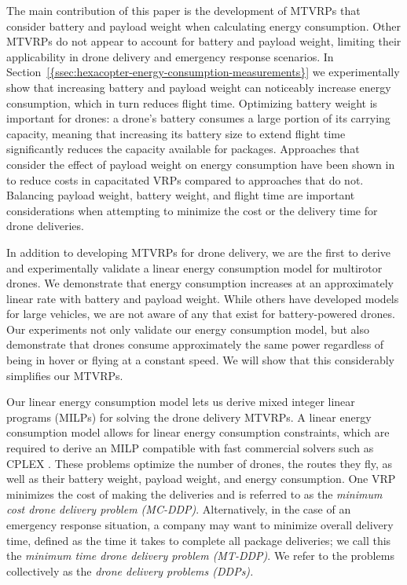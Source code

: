 \documentclass[journal]{IEEEtran}
\begin{document}
The main contribution of this paper is the development of MTVRPs that consider battery and payload weight when calculating energy consumption. Other MTVRPs do not appear to account for battery and payload weight, limiting their applicability in drone delivery and emergency response scenarios. In {Section~\ref{{ssec:hexacopter-energy-consumption-measurements}}} we experimentally show that increasing battery and payload weight can noticeably increase energy consumption, which in turn reduces flight time. Optimizing battery weight is important for drones: a drone's battery consumes a large portion of its carrying capacity, meaning that increasing its battery size to extend flight time significantly reduces the capacity available for packages. Approaches that consider the effect of payload weight on energy consumption have been shown in \cite{Xiao2012} to reduce costs in capacitated VRPs compared to approaches that do not. Balancing payload weight, battery weight, and flight time are important considerations when attempting to minimize the cost or the delivery time for drone deliveries.

In addition to developing MTVRPs for drone delivery, we are the first to derive and experimentally validate a linear energy consumption model for multirotor drones. We demonstrate that energy consumption increases at an approximately linear rate with battery and payload weight. While others have developed models for large vehicles, we are not aware of any that exist for battery-powered drones. Our experiments not only validate our energy consumption model, but also demonstrate that drones consume approximately the same power regardless of being in hover or flying at a constant speed. We will show that this considerably simplifies our MTVRPs.

Our linear energy consumption model lets us derive mixed integer linear programs (MILPs) for solving the drone delivery MTVRPs. A linear energy consumption model allows for linear energy consumption constraints, which are required to derive an MILP compatible with fast commercial solvers such as CPLEX \cite{cplex}. These problems optimize the number of drones, the routes they fly, as well as their battery weight, payload weight, and energy consumption. One VRP minimizes the cost of making the deliveries and is referred to as the \emph{minimum cost drone delivery problem (MC-DDP)}. Alternatively, in the case of an emergency response situation, a company may want to minimize overall delivery time, defined as the time it takes to complete all package deliveries; we call this the \emph{minimum time drone delivery problem (MT-DDP)}. We refer to the problems collectively as the \emph{drone delivery problems (DDPs).}
\end{document}
